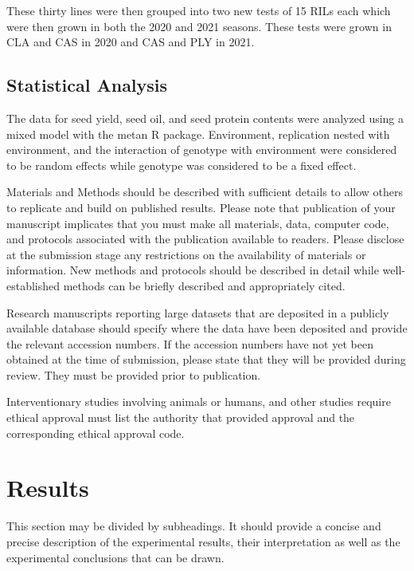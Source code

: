 \documentclass[Agronomy,article,submit,moreauthors,pdftex]{mdpi}
\begin{document}
These thirty lines were then grouped into two new tests of 15 RILs each
which were then grown in both the 2020 and 2021 seasons. These tests
were grown in CLA and CAS in 2020 and CAS and PLY in 2021.

\hypertarget{statistical-analysis}{%
\subsection{Statistical Analysis}\label{statistical-analysis}}

The data for seed yield, seed oil, and seed protein contents were
analyzed using a mixed model with the
metan\citep{olivotoMetanPackageMultienvironment2020} R package.
Environment, replication nested with environment, and the interaction of
genotype with environment were considered to be random effects while
genotype was considered to be a fixed effect.

Materials and Methods should be described with sufficient details to
allow others to replicate and build on published results. Please note
that publication of your manuscript implicates that you must make all
materials, data, computer code, and protocols associated with the
publication available to readers. Please disclose at the submission
stage any restrictions on the availability of materials or information.
New methods and protocols should be described in detail while
well-established methods can be briefly described and appropriately
cited.

Research manuscripts reporting large datasets that are deposited in a
publicly available database should specify where the data have been
deposited and provide the relevant accession numbers. If the accession
numbers have not yet been obtained at the time of submission, please
state that they will be provided during review. They must be provided
prior to publication.

Interventionary studies involving animals or humans, and other studies
require ethical approval must list the authority that provided approval
and the corresponding ethical approval code.

\hypertarget{results}{%
\section{Results}\label{results}}

This section may be divided by subheadings. It should provide a concise
and precise description of the experimental results, their
interpretation as well as the experimental conclusions that can be
drawn.
\end{document}
